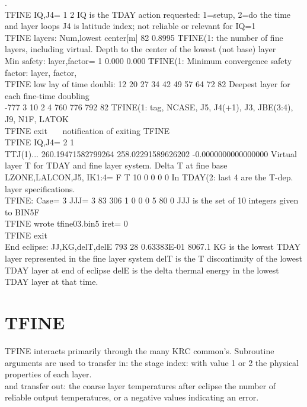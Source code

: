 \documentclass{article}
\begin{document}
. 
\\ TFINE IQ,J4=           1           2
\qi IQ is the TDAY action requested: 1=setup, 2=do the time and layer loops
\qi J4 is latitude index; not reliable or relevant for IQ=1  
\\ TFINE layers: Num,lowest center[m]   82    0.8995
\qi TFINE(1: the number of fine layers, including virtual. Depth to the center of the lowest (not base) layer
\\  Min safety: layer,factor= 1       0.000       0.000
\qi  TFINE(1: Minimum convergence safety factor: layer, factor, 
\\  TFINE low lay of time doubli:  12 20 27 34 42 49 57 64 72 82
\qi Deepest layer for each fine-time doubling
\\    -777      3     10      2      4    760    776    792     82
\qi  TFINE(1: tag, NCASE, J5, J4(+1), J3, JBE(3:4), J9, N1F, LATOK
\\  TFINE exit \ \ \ notification of exiting TFINE
\\  TFINE IQ,J4=           2           1 
\qi
\\  TTJ(1)...   260.19471582799264        258.02291589626202       -0.0000000000000000 
\qi  Virtual layer T for TDAY and fine layer system. Delta T at fine base   
\\ LZONE,LALCON,J5, IK1:4=  F  T    10     0     0     0     0
\qi In TDAY(2: last 4 are the T-dep. layer specifications.
\\ TFINE: Case= 3  JJJ=    3   83  306    1    0    0    0    5   80    0
\qii JJJ is the set of 10 integers given to BIN5F
\\  TFINE wrote tfine03.bin5  iret=            0
\\  TFINE exit
\\ End eclipse: JJ,KG,delT,delE  793  28    0.63383E-01     8067.1 
\qi KG is the lowest  TDAY layer represented in the fine layer system   
\qi delT is the T discontinuity of the lowest TDAY layer at end of eclipse
\qi delE is the delta thermal energy in the lowest TDAY layer at that time.

\section{TFINE}
 TFINE interacts primarily through the many KRC common's. Subroutine arguments are used to transfer in:
\qi the stage index: with value 1 or 2
\qi the physical properties of each layer.
\\ and transfer out:
\qi the coarse layer temperatures after eclipse
\qi the number of reliable output temperatures, or a negative values indicating an error.
\end{document}
